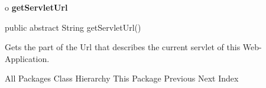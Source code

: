 o {\bf getServletUrl} 

\begin{PRE}
 public abstract String getServletUrl()
\end{PRE}

\begin{description}
\htmlDD Gets the part of the Url that describes the current servlet of this
Web-Application. 

\end{description}

\htmlHR

\begin{PRE}
All Packages  Class Hierarchy  This Package  Previous  Next  Index
\end{PRE}

